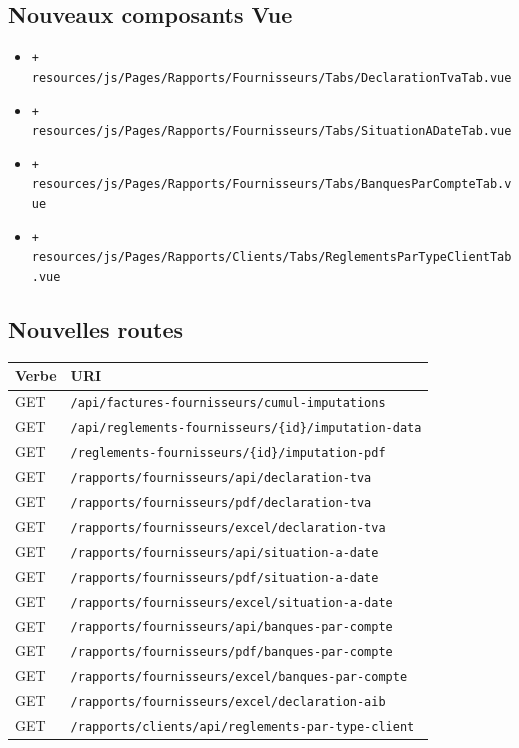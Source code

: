 \documentclass[11pt,a4paper]{article}
\newcommand{\newfile}[1]{\texttt{\small\textcolor{accent}{+ #1}}}
\begin{document}
\subsection{Nouveaux composants Vue}

\begin{itemize}[leftmargin=1.4em]
  \item \newfile{resources/js/Pages/Rapports/Fournisseurs/Tabs/DeclarationTvaTab.vue}
  \item \newfile{resources/js/Pages/Rapports/Fournisseurs/Tabs/SituationADateTab.vue}
  \item \newfile{resources/js/Pages/Rapports/Fournisseurs/Tabs/BanquesParCompteTab.vue}
  \item \newfile{resources/js/Pages/Rapports/Clients/Tabs/ReglementsParTypeClientTab.vue}
\end{itemize}

\subsection{Nouvelles routes}

\begin{longtable}{@{}l >{\raggedright\arraybackslash}p{}@{}}
  \toprule
  \textbf{Verbe} & \textbf{URI} \\
  \midrule \endhead
  GET & \texttt{/api/factures-fournisseurs/cumul-imputations} \\
  GET & \texttt{/api/reglements-fournisseurs/\{id\}/imputation-data} \\
  GET & \texttt{/reglements-fournisseurs/\{id\}/imputation-pdf} \\
  GET & \texttt{/rapports/fournisseurs/api/declaration-tva} \\
  GET & \texttt{/rapports/fournisseurs/pdf/declaration-tva} \\
  GET & \texttt{/rapports/fournisseurs/excel/declaration-tva} \\
  GET & \texttt{/rapports/fournisseurs/api/situation-a-date} \\
  GET & \texttt{/rapports/fournisseurs/pdf/situation-a-date} \\
  GET & \texttt{/rapports/fournisseurs/excel/situation-a-date} \\
  GET & \texttt{/rapports/fournisseurs/api/banques-par-compte} \\
  GET & \texttt{/rapports/fournisseurs/pdf/banques-par-compte} \\
  GET & \texttt{/rapports/fournisseurs/excel/banques-par-compte} \\
  GET & \texttt{/rapports/fournisseurs/excel/declaration-aib} \\
  GET & \texttt{/rapports/clients/api/reglements-par-type-client} \\
  \bottomrule
\end{longtable}
\end{document}
